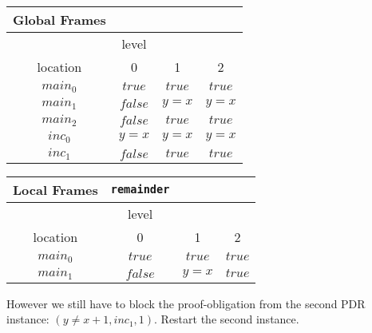 \documentclass{article}
\begin{document}
	\begin{minipage}{.4\textwidth}
		\setlength\tabcolsep{0.35em}
		\begin{center}
			\begin{tabu}{cccc}
				Global Frames \\
				\toprule
				& level \\
				\cmidrule(lr){2-4}
				location & 0 & 1 & 2 \\
				$main_0$ & $true$ & $true$ & $true$  \\
				$main_1$ & $false$ & $y = x$ & $y = x$\\
				$main_2$ & $false$ & $true$ & $true$ \\
				$inc_0$ & $y = x$ & $y = x$ & $y = x$ \\
				$inc_1$ & $false$ & $true$ & $true$\\
				\bottomrule
			\end{tabu}
		\end{center}
	\end{minipage}
	\hfill
	\begin{minipage}{.5\textwidth}
		\setlength\tabcolsep{0.35em}
		\begin{center}
			\begin{tabu}{cccc}
				Local Frames & \texttt{remainder}\\
				\toprule
				& level \\
				\cmidrule(lr){2-4}
				location & 0 & 1 & 2 \\
				\cmidrule{1-4}
				$main_0$ & $true$ & $true$ & $true$ \\
				$main_1$ & $false$ & $y = x$ & $true$\\
				\bottomrule
			\end{tabu}
		\end{center}	
	\end{minipage}
	
	However we still have to block the proof-obligation from the second PDR instance: $(y \neq x + 1, inc_1, 1)$. Restart the second instance. \\ \\
	
\end{document}
